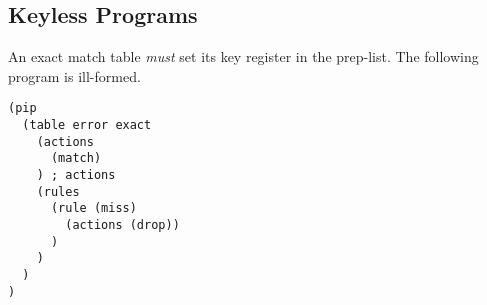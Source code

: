 \documentclass{article}
\begin{document}
\subsection{Keyless Programs}
An exact match table \textit{must} set its key register in the prep-list. The following program is ill-formed.
\begin{verbatim}
(pip
  (table error exact
    (actions
      (match)
    ) ; actions
    (rules
      (rule (miss)
        (actions (drop))
      )
    )
  )
)
\end{verbatim}
\end{document}
